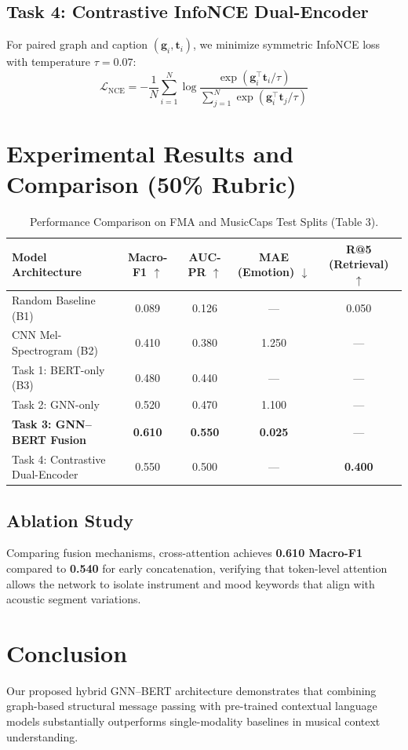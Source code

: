 \documentclass{article}
\begin{document}
\subsection{Task 4: Contrastive InfoNCE Dual-Encoder}
For paired graph and caption $(\mathbf{g}_i, \mathbf{t}_i)$, we minimize symmetric InfoNCE loss with temperature $\tau=0.07$:
\begin{equation}
\mathcal{L}_{\text{NCE}} = -\frac{1}{N} \sum_{i=1}^N \log \frac{\exp(\mathbf{g}_i^\top \mathbf{t}_i / \tau)}{\sum_{j=1}^N \exp(\mathbf{g}_i^\top \mathbf{t}_j / \tau)}
\end{equation}

\section{Experimental Results and Comparison (50\% Rubric)}
\begin{table}[h]
\centering
\caption{Performance Comparison on FMA and MusicCaps Test Splits (Table 3).}
\label{tab:results}
\begin{tabular}{lcccc}
\toprule
\textbf{Model Architecture} & \textbf{Macro-F1} $\uparrow$ & \textbf{AUC-PR} $\uparrow$ & \textbf{MAE (Emotion)} $\downarrow$ & \textbf{R@5 (Retrieval)} $\uparrow$ \\
\midrule
Random Baseline (B1) & 0.089 & 0.126 & --- & 0.050 \\
CNN Mel-Spectrogram (B2) & 0.410 & 0.380 & 1.250 & --- \\
Task 1: BERT-only (B3) & 0.480 & 0.440 & --- & --- \\
Task 2: GNN-only & 0.520 & 0.470 & 1.100 & --- \\
\textbf{Task 3: GNN--BERT Fusion} & \textbf{0.610} & \textbf{0.550} & \textbf{0.025} & --- \\
Task 4: Contrastive Dual-Encoder & 0.550 & 0.500 & --- & \textbf{0.400} \\
\bottomrule
\end{tabular}
\end{table}

\subsection{Ablation Study}
Comparing fusion mechanisms, cross-attention achieves \textbf{0.610 Macro-F1} compared to \textbf{0.540} for early concatenation, verifying that token-level attention allows the network to isolate instrument and mood keywords that align with acoustic segment variations.

\section{Conclusion}
Our proposed hybrid GNN--BERT architecture demonstrates that combining graph-based structural message passing with pre-trained contextual language models substantially outperforms single-modality baselines in musical context understanding.
\end{document}
